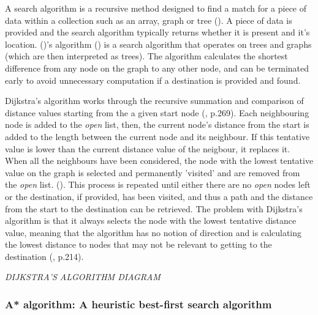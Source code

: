 \documentclass[11pt, a4paper]{article}
\begin{document}
A search algorithm is a recursive method designed to find a match for a piece of data within a collection such as an array, graph or tree (\cite{friedman1976algorithm}). A piece of data is provided and the search algorithm typically returns whether it is present and it's location. (\citeauthor{dijkstra1959note})'s algorithm (\citeyear{dijkstra1959note}) is a search algorithm that operates on trees and graphs (which are then interpreted as trees). The algorithm calculates the shortest difference from any node on the graph to any other node, and can be terminated early to avoid unnecessary computation if a destination is provided and found.

Dijkstra's algorithm works through the recursive summation and comparison of distance values starting from the a given start node (\cite{dijkstra1959note}, p.269). Each neighbouring node is added to the \emph{open} list, then, the current node's distance from the start is added to the length between the current node and its neighbour. If this tentative value is lower than the current distance value of the neigbour, it replaces it. When all the neighbours have been considered, the node with the lowest tentative value on the graph is selected and permanently 'visited' and are removed from the \emph{open} list. (\cite{dijkstra1959note}). This process is repeated until either there are no \emph{open} nodes left or the destination, if provided, has been visited, and thus a path and the distance from the start to the destination can be retrieved. The problem with Dijkstra's algorithm is that it always selects the node with the lowest tentative distance value, meaning that the algorithm has no notion of direction and is calculating the lowest distance to nodes that may not be relevant to getting to the destination (\cite{millington2019ai}, p.214).

\emph{DIJKSTRA'S ALGORITHM DIAGRAM}

\subsubsection{A* algorithm: A heuristic best-first search algorithm}
\end{document}
